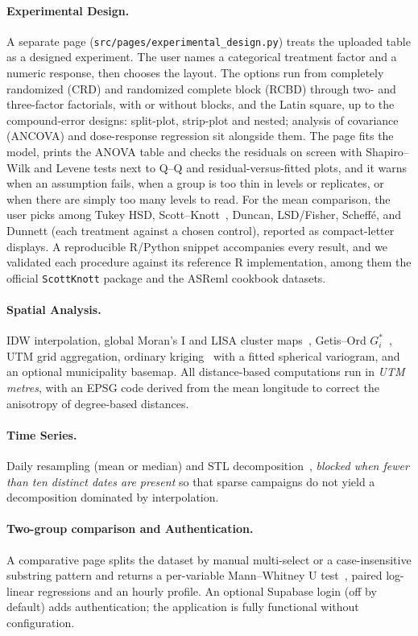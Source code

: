 \documentclass[preprint,12pt,a4paper]{elsarticle}
\begin{document}
\paragraph{Experimental Design.} A separate page (\texttt{src/pages/experimental\_design.py}) treats the uploaded table as a designed experiment. The user names a categorical treatment factor and a numeric response, then chooses the layout. The options run from completely randomized (CRD) and randomized complete block (RCBD) through two- and three-factor factorials, with or without blocks, and the Latin square, up to the compound-error designs: split-plot, strip-plot and nested; analysis of covariance (ANCOVA) and dose-response regression sit alongside them. The page fits the model, prints the ANOVA table and checks the residuals on screen with Shapiro--Wilk and Levene tests next to Q--Q and residual-versus-fitted plots, and it warns when an assumption fails, when a group is too thin in levels or replicates, or when there are simply too many levels to read. For the mean comparison, the user picks among Tukey HSD, Scott--Knott~\cite{ScottKnott1974}, Duncan, LSD/Fisher, Scheff\'e, and Dunnett (each treatment against a chosen control), reported as compact-letter displays. A reproducible R/Python snippet accompanies every result, and we validated each procedure against its reference R implementation, among them the official \texttt{ScottKnott} package and the ASReml cookbook datasets.

\paragraph{Spatial Analysis.} IDW interpolation, global Moran's I and LISA cluster maps~\cite{Anselin1995}, Getis--Ord $G_i^*$~\cite{Getis1992}, UTM grid aggregation, ordinary kriging~\cite{Cressie1993} with a fitted spherical variogram, and an optional municipality basemap. All distance-based computations run in \emph{UTM metres}, with an EPSG code derived from the mean longitude to correct the anisotropy of degree-based distances.

\paragraph{Time Series.} Daily resampling (mean or median) and STL decomposition~\cite{Cleveland1990STL}, \emph{blocked when fewer than ten distinct dates are present} so that sparse campaigns do not yield a decomposition dominated by interpolation.

\paragraph{Two-group comparison and Authentication.} A comparative page splits the dataset by manual multi-select or a case-insensitive substring pattern and returns a per-variable Mann--Whitney U test~\cite{Mann1947}, paired log-linear regressions and an hourly profile. An optional Supabase login (off by default) adds authentication; the application is fully functional without configuration.
\end{document}
